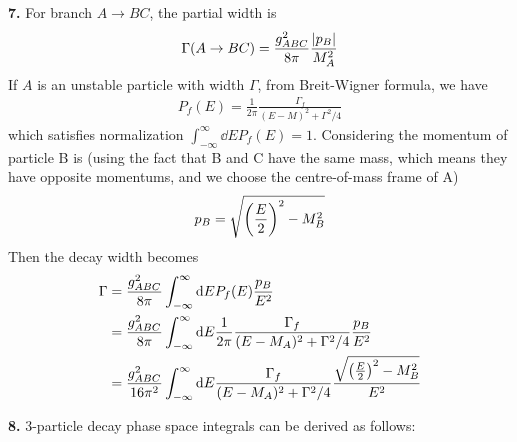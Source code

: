 \documentclass{article}
\begin{document}
{\bf7.} For branch $A\rightarrow BC$, the partial width is\cite{IHP}
\begin{align*}
  \Gamma(A\rightarrow BC)=\frac{g_{ABC}^2}{8\pi}\frac{\abs{p_B}}{M_A^2}
\end{align*}
If $A$ is an unstable particle with width $\Gamma$, from Breit-Wigner formula, we have
\begin{align}
  P_f(E)=\frac{1}{2\pi}\frac{\Gamma_f}{(E-M)^2+\Gamma^2/4}
\end{align}
which satisfies normalization $\int_{-\infty}^{\infty}\dd E P_f(E)=1$. Considering the momentum of particle B is (using the fact that B and C have the same mass, which means they have opposite momentums, and we choose the centre-of-mass frame of A)
\begin{align*}
  p_B=\sqrt{{\pqty{\frac{E}{2}}}^2-M_B^2}
\end{align*}
Then the decay width becomes
\begin{align*}
  \Gamma&=\frac{g_{ABC}^2}{8\pi}\int_{-\infty}^{\infty}\dd E P_f(E)\frac{p_B}{E^2}\\
  &=\frac{g_{ABC}^2}{8\pi}\int_{-\infty}^{\infty}\dd E \frac{1}{2\pi}\frac{\Gamma_f}{(E-M_A)^2+\Gamma^2/4}\frac{p_B}{E^2}\\
  &=\frac{g_{ABC}^2}{16\pi^2}\int_{-\infty}^{\infty}\dd E \frac{\Gamma_f}{(E-M_A)^2+\Gamma^2/4}\frac{\sqrt{{\pqty{\frac{E}{2}}}^2-M_B^2}}{E^2}
\end{align*}

{\bf8.} 3-particle decay phase space integrals can be derived as follows\cite{MPP}:
\end{document}
